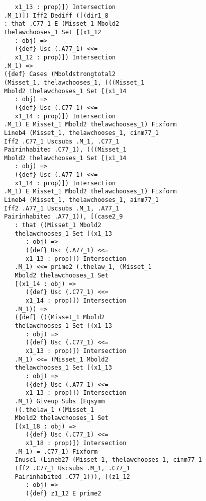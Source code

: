 \documentclass[12pt]{article}
\begin{document}
\begin{verbatim}
                x1_13 : prop)]) Intersection 
             .M_1)]) Iff2 Dediff ([(dir1_8 
             : that .C77_1 E (Misset_1 Mbold2 
             thelawchooses_1 Set [(x1_12 
                : obj) => 
                ({def} Usc (.A77_1) <<= 
                x1_12 : prop)]) Intersection 
             .M_1) => 
             ({def} Cases (Mboldstrongtotal2 
             (Misset_1, thelawchooses_1, (((Misset_1 
             Mbold2 thelawchooses_1 Set [(x1_14 
                : obj) => 
                ({def} Usc (.C77_1) <<= 
                x1_14 : prop)]) Intersection 
             .M_1) E Misset_1 Mbold2 thelawchooses_1) Fixform 
             Lineb4 (Misset_1, thelawchooses_1, cinm77_1 
             Iff2 .C77_1 Uscsubs .M_1, .C77_1 
             Pairinhabited .C77_1), (((Misset_1 
             Mbold2 thelawchooses_1 Set [(x1_14 
                : obj) => 
                ({def} Usc (.A77_1) <<= 
                x1_14 : prop)]) Intersection 
             .M_1) E Misset_1 Mbold2 thelawchooses_1) Fixform 
             Lineb4 (Misset_1, thelawchooses_1, ainm77_1 
             Iff2 .A77_1 Uscsubs .M_1, .A77_1 
             Pairinhabited .A77_1)), [(case2_9 
                : that ((Misset_1 Mbold2 
                thelawchooses_1 Set [(x1_13 
                   : obj) => 
                   ({def} Usc (.A77_1) <<= 
                   x1_13 : prop)]) Intersection 
                .M_1) <<= prime2 (.thelaw_1, (Misset_1 
                Mbold2 thelawchooses_1 Set 
                [(x1_14 : obj) => 
                   ({def} Usc (.C77_1) <<= 
                   x1_14 : prop)]) Intersection 
                .M_1)) => 
                ({def} (((Misset_1 Mbold2 
                thelawchooses_1 Set [(x1_13 
                   : obj) => 
                   ({def} Usc (.C77_1) <<= 
                   x1_13 : prop)]) Intersection 
                .M_1) <<= (Misset_1 Mbold2 
                thelawchooses_1 Set [(x1_13 
                   : obj) => 
                   ({def} Usc (.A77_1) <<= 
                   x1_13 : prop)]) Intersection 
                .M_1) Giveup Subs (Eqsymm 
                ((.thelaw_1 ((Misset_1 
                Mbold2 thelawchooses_1 Set 
                [(x1_18 : obj) => 
                   ({def} Usc (.C77_1) <<= 
                   x1_18 : prop)]) Intersection 
                .M_1) = .C77_1) Fixform 
                Inusc1 (Lineb27 (Misset_1, thelawchooses_1, cinm77_1 
                Iff2 .C77_1 Uscsubs .M_1, .C77_1 
                Pairinhabited .C77_1))), [(z1_12 
                   : obj) => 
                   ({def} z1_12 E prime2 

\end{verbatim}
\end{document}
